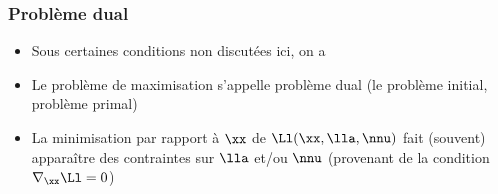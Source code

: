 \documentclass[9pt,table]{beamer} %
\begin{document}
\begin{frame}
\frametitle{Problème dual}

\begin{itemize}[label=\tiny$\blacksquare$]
\item \begin{thm} Sous certaines conditions non discutées ici, on a

\end{thm}

\item Le problème de maximisation s'appelle \alert{problème dual} (le problème initial, \alert{problème primal})

\item La minimisation par rapport à $\xx$ de $\Ll(\xx,\lla,\nnu)$ fait (souvent) apparaître des contraintes sur $\lla$ et/ou $\nnu$ (provenant de la condition $\nabla_{\xx} \Ll = 0$)
\end{itemize}

\end{frame}
\end{document}

